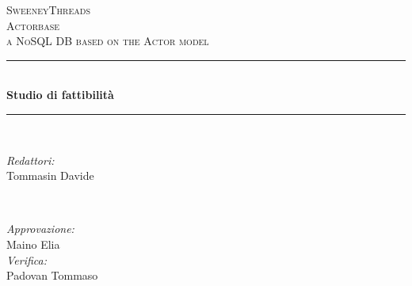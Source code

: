 \documentclass[a4paper]{article}
\begin{document}
	
	\begin{titlepage}
		\newcommand{\HRule}{\rule{\linewidth}{0.5mm}} 
		\center  
		
		\textsc{\LARGE SweeneyThreads}\\[1.5cm] 
		\textsc{\Large Actorbase}\\[0.5cm] 
		\textsc{\large a NoSQL DB based on the Actor model}\\[0.5cm]
		
		
		\HRule \\[0.4cm]
		{ \huge \bfseries Studio di fattibilità}\\[0.4cm] 
		\HRule \\[1.5cm]
		
		\begin{minipage}{0.4\textwidth}
			\begin{flushleft} \large
				\emph{Redattori:}\\
				Tommasin Davide\\
			\end{flushleft}
		\end{minipage}
		~
		\begin{minipage}{0.4\textwidth}
			\begin{flushright} \large
				\emph{Approvazione:} \\
                Maino Elia \\
				\emph{Verifica:} \\
                Padovan Tommaso \\
			\end{flushright}
		\end{minipage}
		

\end{titlepage}
\end{document}
